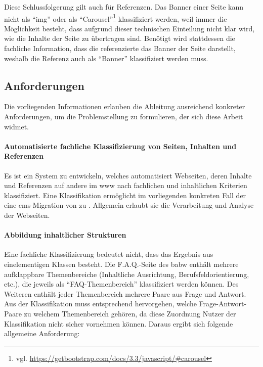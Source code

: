         Diese Schlussfolgerung gilt auch für Referenzen.
        Das Banner einer Seite kann nicht als "`img"'
        oder als "`Carousel"'\footnote{vgl. \url{https://getbootstrap.com/docs/3.3/javascript/\#carousel}}
        klassifiziert werden, weil immer die Möglichkeit besteht,
        dass aufgrund dieser technischen Einteilung nicht klar wird,
        wie die Inhalte der Seite zu übertragen sind.
        Benötigt wird stattdessen die fachliche Information,
        dass die referenzierte {\resource} das Banner der Seite darstellt,
        weshalb die Referenz auch als "`Banner"' klassifiziert werden muss.

    \subsection{Anforderungen}
        \label{section:requirements}
        Die vorliegenden Informationen erlauben
        die Ableitung ausreichend konkreter Anforderungen,
        um die Problemstellung zu formulieren, der sich diese Arbeit widmet.

        \paragraph*{Automatisierte fachliche Klassifizierung von Seiten, Inhalten und Referenzen}
        Es ist ein System zu entwickeln, welches automatisiert Webseiten,
        deren Inhalte und Referenzen auf andere {\resources} im \gls{www}
        nach fachlichen und inhaltlichen Kriterien klassifiziert.
        Eine Klassifikation ermöglicht im vorliegenden konkreten Fall
        der {\fernUni} eine \gls{cms}-Migration von {\wordpress} zu {\imperia}.
        Allgemein erlaubt sie die Verarbeitung und Analyse der Webseiten.

        \paragraph*{Abbildung inhaltlicher Strukturen}
        Eine fachliche Klassifizierung bedeutet nicht,
        dass das Ergebnis aus einelementigen Klassen besteht.
        Die F.A.Q.-Seite des \gls{babw} enthält mehrere aufklappbare
        Themenbereiche (Inhaltliche Ausrichtung, Berufsfeldorientierung, etc.),
        die jeweils als "`FAQ-Themenbereich"' klassifiziert werden können.
        Des Weiteren enthält jeder Themenbereich mehrere Paare aus Frage und Antwort.
        Aus der Klassifikation muss entsprechend hervorgehen,
        welche Frage-Antwort-Paare zu welchem Themenbereich gehören,
        da diese Zuordnung Nutzer der Klassifikation nicht sicher vornehmen können.
        Daraus ergibt sich folgende allgemeine Anforderung:

